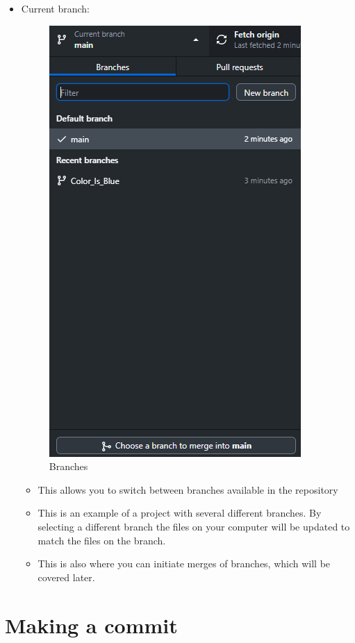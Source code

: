 \documentclass[10pt,twocolumn]{article}
\begin{document}
\begin{itemize}
\begin{itemize}
        \end{itemize}
        \item Current branch:
\begin{figure}
    \centering
    \includegraphics[width=0.5\linewidth]{branches.png}
    \caption{Branches}
\end{figure}
        \begin{itemize}
            \item This allows you to switch between branches available in the repository
            \item This is an example of a project with several different branches. By selecting a different branch the files on your computer will be updated to match the files on the branch.
            \item This is also where you can initiate merges of branches, which will be covered later.
        \end{itemize}
    \end{itemize}

\section{Making a commit}
\end{document}
